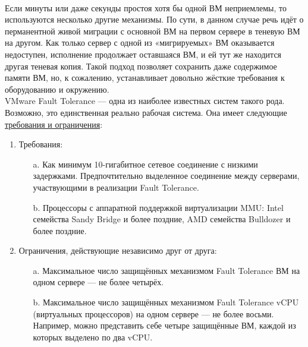 \documentclass[14pt, a4paper]{article}
\begin{document}
\begin{figure}[h]
    \centering
    \\  
    \label{framework} 
\end{figure}

Если минуты или даже секунды простоя хотя бы одной ВМ неприемлемы, то используются несколько
другие механизмы. По сути, в данном случае речь идёт о перманентной живой миграции с основной
ВМ на первом сервере в теневую ВМ на другом. Как только сервер с одной из «мигрируемых» ВМ
оказывается недоступен, исполнение продолжает оставшаяся ВМ, и ей тут же находится другая
теневая копия. Такой подход позволяет сохранить даже содержимое памяти ВМ, но, к сожалению,
устанавливает довольно жёсткие требования к оборудованию и окружению.\\

VMware Fault Tolerance — одна из наиболее известных систем такого рода. Возможно, это
единственная реально рабочая система. Она имеет следующие \href{https://docs.vmware.com/en/VMware-vSphere/6.7/com.vmware.vsphere.avail.doc/GUID-57929CF0-DA9B-407A-BF2E-E7B72708D825.html}{требования и ограничения}:

\begin{enumerate}
    \item Требования:
    \begin{enumerate}
        \item[a.] Как минимум 10-гигабитное сетевое соединение с низкими задержками.
        Предпочтительно выделенное соединение между серверами, участвующими в
        реализации Fault Tolerance.
        \item[b.] Процессоры с аппаратной поддержкой виртуализации MMU: Intel семейства Sandy
        Bridge и более поздние, AMD семейства Bulldozer и более поздние.
    \end{enumerate}
    \item Ограничения, действующие независимо друг от друга:
    \begin{enumerate}
        \item[a.] Максимальное число защищённых механизмом Fault Tolerance ВМ на одном сервере
        — не более четырёх.
        \item[b.] Максимальное число защищённых механизмом Fault Tolerance vCPU (виртуальных
        процессоров) на одном сервере — не более восьми. Например, можно представить
        себе четыре защищённые ВМ, каждой из которых выделено по два vCPU.
    \end{enumerate}
\end{enumerate}
\end{document}
